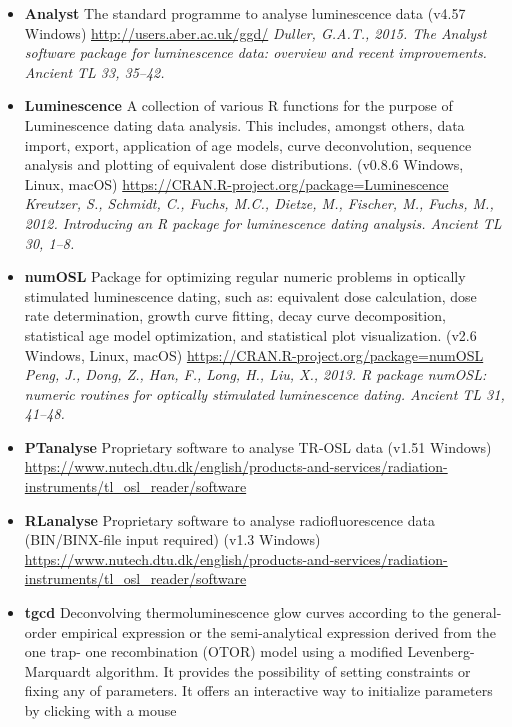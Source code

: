 \documentclass[]{article}
\providecommand{\tightlist}{%
  \setlength{\itemsep}{0pt}\setlength{\parskip}{0pt}}
\begin{document}
\begin{itemize}
\tightlist
\item
  \textbf{Analyst}
  The standard programme to analyse luminescence data
  (v4.57 \textbar{} Windows)
  \url{http://users.aber.ac.uk/ggd/}
  \emph{Duller, G.A.T., 2015. The Analyst software package for luminescence data: overview and recent improvements. Ancient TL 33, 35--42.}
\item
  \textbf{Luminescence}
  A collection of various R functions for the purpose of Luminescence
  dating data analysis. This includes, amongst others, data import, export,
  application of age models, curve deconvolution, sequence analysis and
  plotting of equivalent dose distributions.
  (v0.8.6 \textbar{} Windows, Linux, macOS)
  \url{https://CRAN.R-project.org/package=Luminescence}
  \emph{Kreutzer, S., Schmidt, C., Fuchs, M.C., Dietze, M., Fischer, M., Fuchs, M., 2012. Introducing an R package for luminescence dating analysis. Ancient TL 30, 1--8.}
\item
  \textbf{numOSL}
  Package for optimizing regular numeric problems in optically stimulated luminescence
  dating, such as: equivalent dose calculation, dose rate determination, growth curve fitting,
  decay curve decomposition, statistical age model optimization, and statistical plot visualization.
  (v2.6 \textbar{} Windows, Linux, macOS)
  \url{https://CRAN.R-project.org/package=numOSL}
  \emph{Peng, J., Dong, Z., Han, F., Long, H., Liu, X., 2013. R package numOSL: numeric routines for optically stimulated luminescence dating. Ancient TL 31, 41--48.}
\item
  \textbf{PTanalyse}
  Proprietary software to analyse TR-OSL data
  (v1.51 \textbar{} Windows)
  \url{https://www.nutech.dtu.dk/english/products-and-services/radiation-instruments/tl_osl_reader/software}
  \emph{ }
\item
  \textbf{RLanalyse}
  Proprietary software to analyse radiofluorescence data (BIN/BINX-file input required)
  (v1.3 \textbar{} Windows)
  \url{https://www.nutech.dtu.dk/english/products-and-services/radiation-instruments/tl_osl_reader/software}
  \emph{ }
\item
  \textbf{tgcd}
  Deconvolving thermoluminescence glow curves according to the general-order
  empirical expression or the semi-analytical expression derived from the one trap-
  one recombination (OTOR) model using a modified Levenberg-Marquardt algorithm.
  It provides the possibility of setting constraints or fixing any of parameters.
  It offers an interactive way to initialize parameters by clicking with a mouse

\end{itemize}
\end{document}
